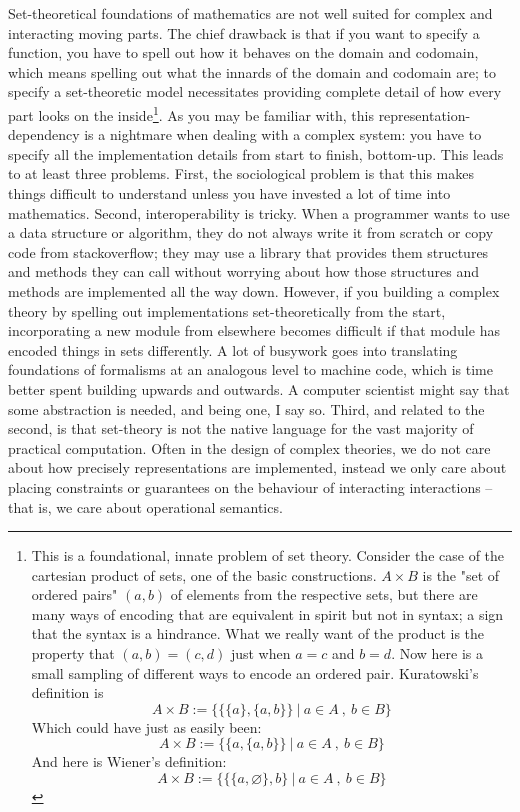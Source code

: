 
Set-theoretical foundations of mathematics are not well suited for complex and interacting moving parts. The chief drawback is that if you want to specify a function, you have to spell out how it behaves on the domain and codomain, which means spelling out what the innards of the domain and codomain are; to specify a set-theoretic model necessitates providing complete detail of how every part looks on the inside\footnote{This is a foundational, innate problem of set theory. Consider the case of the cartesian product of sets, one of the basic constructions. $A \times B$ is the "set of ordered pairs" $(a,b)$ of elements from the respective sets, but there are many ways of encoding that are equivalent in spirit but not in syntax; a sign that the syntax is a hindrance. What we really want of the product is the property that $(a,b) = (c,d)$ just when $a = c$ and $b = d$. Now here is a small sampling of different ways to encode an ordered pair. Kuratowski's definition is
\[A \times B := \bigg\{ \{\{a\},\{a,b\}\} \ | \ a \in A \ , \ b \in B \bigg\}\]
Which could have just as easily been:
\[A \times B := \bigg\{ \{a,\{a,b\}\} \ | \ a \in A \ , \ b \in B \bigg\}\]
And here is Wiener's definition:
\[A \times B := \bigg\{ \{\{a,\varnothing\},b\} \ | \ a \in A \ , \ b \in B \bigg\}\]}. As you may be familiar with, this representation-dependency is a nightmare when dealing with a complex system: you have to specify all the implementation details from start to finish, bottom-up. This leads to at least three problems. First, the sociological problem is that this makes things difficult to understand unless you have invested a lot of time into mathematics. Second, interoperability is tricky. When a programmer wants to use a data structure or algorithm, they do not always write it from scratch or copy code from stackoverflow; they may use a library that provides them structures and methods they can call without worrying about how those structures and methods are implemented all the way down. However, if you building a complex theory by spelling out implementations set-theoretically from the start, incorporating a new module from elsewhere becomes difficult if that module has encoded things in sets differently. A lot of busywork goes into translating foundations of formalisms at an analogous level to machine code, which is time better spent building upwards and outwards. A computer scientist might say that some abstraction is needed, and being one, I say so. Third, and related to the second, is that set-theory is not the native language for the vast majority of practical computation. Often in the design of complex theories, we do not care about how precisely representations are implemented, instead we only care about placing constraints or guarantees on the behaviour of interacting interactions -- that is, we care about operational semantics.\\

